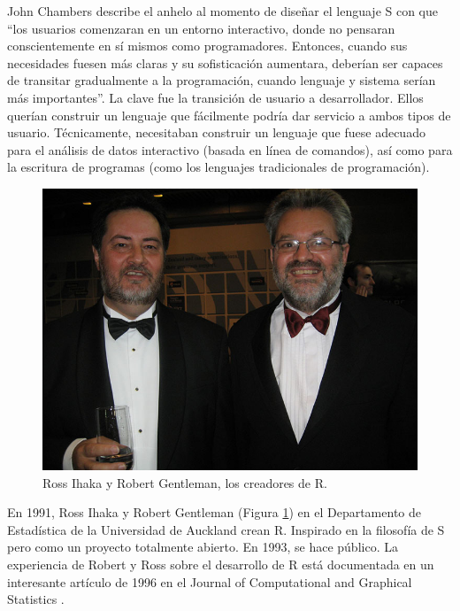 \documentclass[
]{book}
\begin{document}
John Chambers describe el anhelo al momento de diseñar el lenguaje S con que ``los usuarios comenzaran en un entorno interactivo, donde no pensaran conscientemente en sí mismos como programadores. Entonces, cuando sus necesidades fuesen más claras y su sofisticación aumentara, deberían ser capaces de transitar gradualmente a la programación, cuando lenguaje y sistema serían más importantes''. La clave fue la transición de usuario a desarrollador. Ellos querían construir un lenguaje que fácilmente podría dar servicio a ambos tipos de usuario. Técnicamente, necesitaban construir un lenguaje que fuese adecuado para el análisis de datos interactivo (basada en línea de comandos), así como para la escritura de programas (como los lenguajes tradicionales de programación).

\begin{figure}

{\centering \includegraphics[width=10in]{img/creators} 

}

\caption{Ross Ihaka y Robert Gentleman, los creadores de R.}\label{fig:img-crea}
\end{figure}

En 1991, Ross Ihaka y Robert Gentleman (Figura \ref{fig:img-crea}) en el Departamento de Estadística de la Universidad de Auckland crean R. Inspirado en la filosofía de S pero como un proyecto totalmente abierto. En 1993, se hace público. La experiencia de Robert y Ross sobre el desarrollo de R está documentada en un interesante artículo de 1996 en el Journal of Computational and Graphical Statistics \citep{Ihaka1996}.
\end{document}
